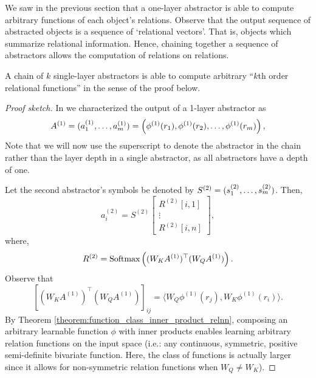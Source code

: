 We saw in the previous section that a one-layer abstractor is able to compute arbitrary functions  of each object's relations. Observe that the output sequence of abstracted objects is a sequence of `relational vectors'. That is, objects which summarize relational information. Hence, chaining together a sequence of  abstractors allows the computation of relations on relations.

\begin{lemma}
	\label{lemma:function_class_composed_abstractors}
	A chain of \(k\) single-layer  abstractors is able to compute arbitrary ``\(k\)th order relational functions'' in the sense of the proof below.
\end{lemma}
\begin{proof}[Proof sketch]
	In  we characterized the output of a 1-layer abstractor as
	\begin{equation*}
		A^{(1)} = (a_1^{(1)}, \ldots, a_m^{(1)}) = \left(\phi^{(1)}(r_1), \phi^{(1)}(r_2), \ldots, \phi^{(1)}(r_m)\right),
	\end{equation*}
	Note that we will now use the superscript to denote the abstractor in the chain rather than the layer depth in a single  abstractor, as all  abstractors have a depth of one.

	Let the second abstractor's symbols be denoted by \(S^{(2)} = (s_1^{(2)}, \ldots, s_m^{(2)})\). Then,
	\begin{equation*}
		a_i^{(2)} = S^{(2)} \begin{bmatrix}R^{(2)}[i,1] \\ \vdots \\ R^{(2)}[i,n]\end{bmatrix},
	\end{equation*}
	where,
	\begin{equation*}
		R^{(2)} = \text{Softmax}\left((W_K A^{(1)})^\top (W_Q A^{(1)})\right).
	\end{equation*}
	Observe that
	\begin{equation*}
		\left[(W_K A^{(1)})^\top (W_Q A^{(1)})\right]_{ij} = \langle W_Q \phi^{(1)}(r_j), W_K \phi^{(1)}(r_i) \rangle.
	\end{equation*}
	By Theorem \ref{theorem:function_class_inner_product_relnn}, composing an arbitrary learnable function \(\phi\) with inner products enables learning arbitrary relation functions on the input space (i.e.: any continuous, symmetric, positive semi-definite bivariate function. Here, the class of functions is actually larger since it allows for non-symmetric relation functions when \(W_Q \neq W_K\)).


\end{proof}
